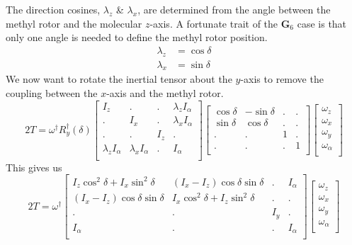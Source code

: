 \documentclass{article}
\begin{document}
The direction cosines, $\lambda_{z}$ \& $\lambda_{x}$, are determined from the angle between the methyl rotor and the molecular $z$-axis. A fortunate trait of the $\mathbf{G}_{6}$ case is that only one angle is needed to define the methyl rotor position.
\begin{align}
	\lambda_{z} &= \cos\delta \\
	\lambda_{x} &= \sin\delta
\end{align}
We now want to rotate the inertial tensor about the $y$-axis to remove the coupling between the $x$-axis and the methyl rotor.
\begin{equation}
	2T = \omega^{\dagger}R_{y}^{\dagger}(\delta)
	\begin{bmatrix}
		I_{z} & . & . & \lambda_{z}I_{\alpha} \\
		. & I_{x} & . & \lambda_{x}I_{\alpha} \\
		. & . & I_{z} & . \\
		\lambda_{z}I_{\alpha} & \lambda_{x}I_{\alpha} & . & I_{\alpha} \\
	\end{bmatrix}
	\begin{bmatrix}
		\cos\delta & -\sin\delta & . & . \\
		\sin\delta & \cos\delta & . & . \\
		. & . & 1 & . \\
		. & . & . & 1 \\
	\end{bmatrix}
	\begin{bmatrix}
		\omega_{z} \\
		\omega_{x} \\
		\omega_{y} \\
		\omega_{\alpha} \\
	\end{bmatrix}
\end{equation}
This gives us 
\begin{equation}
	2T = \omega^{\dagger}
	\begin{bmatrix}
		I_{z}\cos^{2}\delta + I_{x}\sin^{2}\delta & (I_{x} - I_{z})\cos\delta\sin\delta & . & I_{\alpha} \\
		(I_{x} - I_{z})\cos\delta\sin\delta & I_{x}\cos^{2}\delta + I_{z}\sin^{2}\delta & . & . \\
		. & . & I_{y} & . \\
		I_{\alpha} & . & . & I_{\alpha} \\
	\end{bmatrix}
	\begin{bmatrix}
		\omega_{z} \\
		\omega_{x} \\
		\omega_{y} \\
		\omega_{\alpha} \\
	\end{bmatrix}
\end{equation}
\end{document}
